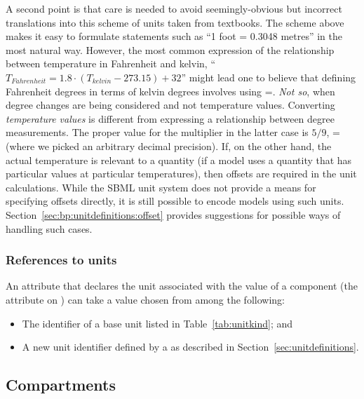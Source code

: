 A second point is that care is needed to avoid seemingly-obvious
but incorrect translations into this scheme of units taken from
textbooks.  The scheme above makes it easy to formulate statements
such as ``1 foot = 0.3048 metres'' in the most natural way.
However, the most common expression of the relationship between
temperature in Fahrenheit and kelvin, ``$T_{Fahrenheit} = 1.8
\cdot (T_{kelvin} - 273.15) + 32$'' might lead one to believe that
defining Fahrenheit degrees in terms of kelvin degrees involves
using =.  \emph{Not so}, when degree
changes are being considered and not temperature values.
Converting \emph{temperature values} is different from expressing
a relationship between degree measurements.  The proper value for
the multiplier in the latter case is $5/9$, \ie
{}= (where we picked an arbitrary
decimal precision).  If, on the other hand, the actual temperature
is relevant to a quantity (\eg if a model uses a quantity that has
particular values at particular temperatures), then offsets are
required in the unit calculations.  While the SBML unit system
does not provide a means for specifying offsets directly, it is
still possible to encode models using such units.
Section~\ref{sec:bp:unitdefinitions:offset} provides suggestions
for possible ways of handling such cases.


\subsubsection{References to units}

An attribute that declares the unit associated with the value of
a component (\eg the attribute  on \Parameter) can
take a value chosen from among the following:
\begin{itemize}
  
\item The identifier of a base unit listed in
  Table~\vref{tab:unitkind}; and

\item A new unit identifier defined by a \UnitDefinition as
  described in Section~\ref{sec:unitdefinitions}.

\end{itemize}


\subsection{Compartments}
\label{sec:compartments}

